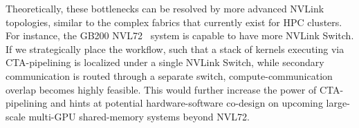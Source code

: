 Theoretically, these bottlenecks can be resolved by more advanced NVLink topologies, similar to the complex fabrics that currently exist for HPC clusters. For instance, the GB200 NVL72~\cite{nvidia2024gb200nvl72} system is capable to have more NVLink Switch. If we strategically place the workflow, such that a stack of kernels executing via CTA-pipelining is localized under a single NVLink Switch, while secondary communication is routed through a separate switch, compute-communication overlap becomes highly feasible. This would further increase the power of CTA-pipelining and hints at potential hardware-software co-design on upcoming large-scale multi-GPU shared-memory systems beyond NVL72.












